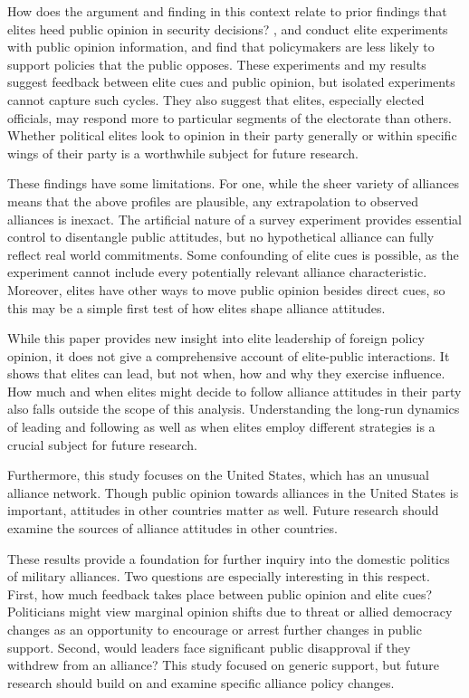 \documentclass[12pt]{article}
\begin{document}
How does the argument and finding in this context relate to prior findings that elites heed public opinion in security decisions?
\citet{Tomzetal2020}, \citet{LinGreenberg2021} and \citet{ChuRechhia2021} conduct elite experiments with public opinion information, and find that policymakers are less likely to support policies that the public opposes.
These experiments and my results suggest feedback between elite cues and public opinion, but isolated experiments cannot capture such cycles.
They also suggest that elites, especially elected officials, may respond more to particular segments of the electorate than others. 
Whether political elites look to opinion in their party generally or within specific wings of their party is a worthwhile subject for future research.


These findings have some limitations. 
For one, while the sheer variety of alliances means that the above profiles are plausible, any extrapolation to observed alliances is inexact. 
The artificial nature of a survey experiment provides essential control to disentangle public attitudes, but no hypothetical alliance can fully reflect real world commitments.
Some confounding of elite cues is possible, as the experiment cannot include every potentially relevant alliance characteristic. 
Moreover, elites have other ways to move public opinion besides direct cues, so this may be a simple first test of how elites shape alliance attitudes. 


While this paper provides new insight into elite leadership of foreign policy opinion, it does not give a comprehensive account of elite-public interactions.
It shows that elites can lead, but not when, how and why they exercise influence. 
How much and when elites might decide to follow alliance attitudes in their party also falls outside the scope of this analysis. 
Understanding the long-run dynamics of leading and following as well as when elites employ different strategies is a crucial subject for future research. 


Furthermore, this study focuses on the United States, which has an unusual alliance network. 
Though public opinion towards alliances in the United States is important, attitudes in other countries matter as well. 
Future research should examine the sources of alliance attitudes in other countries. 


These results provide a foundation for further inquiry into the domestic politics of military alliances. 
Two questions are especially interesting in this respect.
First, how much feedback takes place between public opinion and elite cues? 
Politicians might view marginal opinion shifts due to threat or allied democracy changes as an opportunity to encourage or arrest further changes in public support.
Second, would leaders face significant public disapproval if they withdrew from an alliance? 
This study focused on generic support, but future research should build on \citet{TomzWeeks2021} and examine specific alliance policy changes. 
\end{document}
